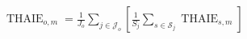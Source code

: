 \documentclass[border=8pt]{standalone}
\begin{document}
\color{ink}
$\displaystyle \operatorname{THAIE}_{o,m}=\frac{1}{J_o}\sum_{j\in\mathcal J_o}\left[\frac{1}{S_j}\sum_{s\in\mathcal S_j}\operatorname{THAIE}_{s,m}\right]$
\end{document}
